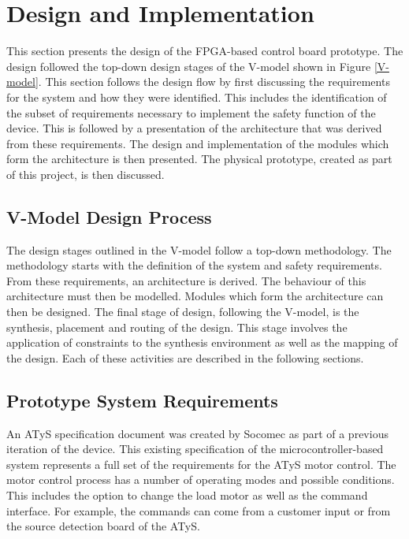 \chapter{Design and Implementation}
\label{design}

This section presents the design of the FPGA-based control board prototype. The design followed the top-down design stages of the V-model shown in Figure \ref{V-model}. This section follows the design flow by first discussing the requirements for the system and how they were identified. This includes the identification of the subset of requirements necessary to implement the safety function of the device. This is followed by a presentation of the architecture that was derived from these requirements. The design and implementation of the modules which form the architecture is then presented. The physical prototype, created as part of this project, is then discussed.

\section{V-Model Design Process}


The design stages outlined in the V-model follow a top-down methodology. The methodology starts with the definition of the system and safety requirements.
From these requirements, an architecture is derived.
The behaviour of this architecture must then be modelled. 
Modules which form the architecture can then be designed.
The final stage of design, following the V-model, is the synthesis, placement and routing of the design. This stage involves the application of constraints to the synthesis environment as well as the mapping of the design.
Each of these activities are described in the following sections.




\section{Prototype System Requirements}

An ATyS specification document was created by Socomec as part of a previous iteration of the device. 
This existing specification of the microcontroller-based system represents a full set of the requirements for the ATyS motor control. The motor control process has a number of operating modes and possible conditions. This includes the option to change the load motor as well as the command interface. For example, the commands can come from a customer input or from the source detection board of the ATyS. 


